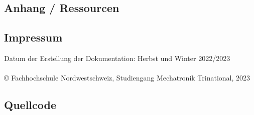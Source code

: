 \begin{appendix} %

\section{Anhang / Ressourcen}

\subsection{Impressum}
Datum der Erstellung der Dokumentation: Herbst und Winter 2022/2023\\
\\
© Fachhochschule Nordwestschweiz, Studiengang Mechatronik Trinational, 2023

\subsection{Quellcode}




\pagebreak

\listoffigures
\listoftables

\end{appendix}
